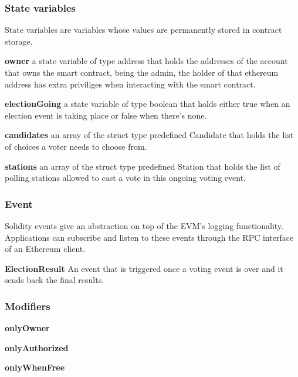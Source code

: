 \subsubsection{State variables}

State variables are variables whose values are permanently stored in contract storage.

\begin{list}{}{}
\item \textbf{owner} a state variable of type address that holds the addresses of the account that owns the smart contract, being the admin, the holder of that ethereum address has extra priviliges when interacting with the smart contract. 
\item \textbf{electionGoing} a state variable of type boolean that holds either true when an election event is taking place or false when there's none.
\item \textbf{candidates} an array of the struct type predefined Candidate that holds the list of choices a voter needs to choose from.
\item \textbf{stations} an array of the struct type predefined Station that holds the list of polling stations allowed to cast a vote in this ongoing voting event.
\end{list}

\subsubsection{Event}

Solidity events give an abstraction on top of the EVM’s logging functionality. Applications can subscribe and listen to these events through the RPC interface of an Ethereum client.

\begin{list}{}{}
\item \textbf{ElectionResult} An event that is triggered once a voting event is over and it sends back the final results.
\end{list}

\subsubsection{Modifiers}

\begin{list}{}{}
\item \textbf{onlyOwner}
\item \textbf{onlyAuthorized}
\item \textbf{onlyWhenFree}
\end{list}

